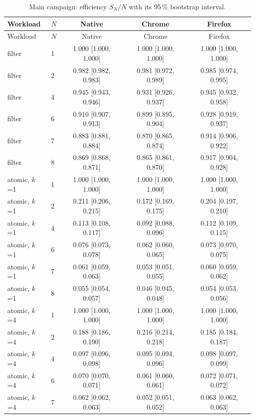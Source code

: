 {\small
\begin{longtable}{llccc}
\caption{Main campaign: efficiency $S_N/N$ with its 95\,\% bootstrap interval.}\label{tab:efficiency} \\
\toprule
Workload & $N$ & Native & Chrome & Firefox \\
\midrule
\endfirsthead
\toprule
Workload & $N$ & Native & Chrome & Firefox \\
\midrule
\endhead
\bottomrule
\endfoot
filter & 1 & 1.000 [1.000, 1.000] & 1.000 [1.000, 1.000] & 1.000 [1.000, 1.000] \\
filter & 2 & 0.982 [0.982, 0.983] & 0.981 [0.972, 0.989] & 0.985 [0.974, 0.995] \\
filter & 4 & 0.945 [0.943, 0.946] & 0.931 [0.926, 0.937] & 0.945 [0.932, 0.958] \\
filter & 6 & 0.910 [0.907, 0.913] & 0.899 [0.895, 0.904] & 0.928 [0.919, 0.937] \\
filter & 7 & 0.883 [0.881, 0.884] & 0.870 [0.865, 0.874] & 0.914 [0.906, 0.922] \\
filter & 8 & 0.869 [0.868, 0.871] & 0.865 [0.861, 0.870] & 0.917 [0.904, 0.928] \\
\midrule
atomic, $k$=1 & 1 & 1.000 [1.000, 1.000] & 1.000 [1.000, 1.000] & 1.000 [1.000, 1.000] \\
atomic, $k$=1 & 2 & 0.211 [0.206, 0.215] & 0.172 [0.169, 0.175] & 0.204 [0.197, 0.210] \\
atomic, $k$=1 & 4 & 0.113 [0.108, 0.117] & 0.092 [0.088, 0.096] & 0.112 [0.109, 0.115] \\
atomic, $k$=1 & 6 & 0.076 [0.073, 0.078] & 0.062 [0.060, 0.065] & 0.073 [0.070, 0.075] \\
atomic, $k$=1 & 7 & 0.061 [0.059, 0.063] & 0.053 [0.051, 0.055] & 0.060 [0.059, 0.062] \\
atomic, $k$=1 & 8 & 0.055 [0.054, 0.057] & 0.046 [0.045, 0.048] & 0.054 [0.053, 0.056] \\
\midrule
atomic, $k$=4 & 1 & 1.000 [1.000, 1.000] & 1.000 [1.000, 1.000] & 1.000 [1.000, 1.000] \\
atomic, $k$=4 & 2 & 0.188 [0.186, 0.190] & 0.216 [0.214, 0.218] & 0.185 [0.184, 0.187] \\
atomic, $k$=4 & 4 & 0.097 [0.096, 0.098] & 0.095 [0.094, 0.096] & 0.098 [0.097, 0.099] \\
atomic, $k$=4 & 6 & 0.070 [0.070, 0.071] & 0.061 [0.060, 0.061] & 0.072 [0.071, 0.072] \\
atomic, $k$=4 & 7 & 0.062 [0.062, 0.063] & 0.052 [0.051, 0.052] & 0.063 [0.062, 0.063] \\

\end{longtable}}
